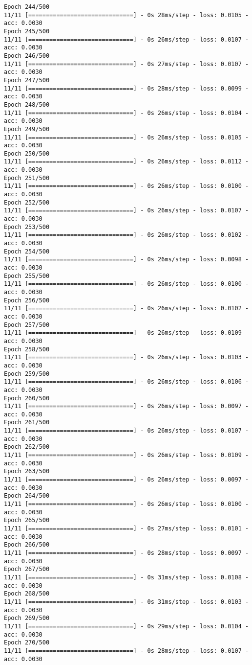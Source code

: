 \documentclass[11pt]{article}
\begin{document}
\begin{Verbatim}[commandchars=\\\{\}]
Epoch 244/500
11/11 [==============================] - 0s 28ms/step - loss: 0.0105 - acc: 0.0030
Epoch 245/500
11/11 [==============================] - 0s 26ms/step - loss: 0.0107 - acc: 0.0030
Epoch 246/500
11/11 [==============================] - 0s 27ms/step - loss: 0.0107 - acc: 0.0030
Epoch 247/500
11/11 [==============================] - 0s 28ms/step - loss: 0.0099 - acc: 0.0030
Epoch 248/500
11/11 [==============================] - 0s 26ms/step - loss: 0.0104 - acc: 0.0030
Epoch 249/500
11/11 [==============================] - 0s 26ms/step - loss: 0.0105 - acc: 0.0030
Epoch 250/500
11/11 [==============================] - 0s 26ms/step - loss: 0.0112 - acc: 0.0030
Epoch 251/500
11/11 [==============================] - 0s 26ms/step - loss: 0.0100 - acc: 0.0030
Epoch 252/500
11/11 [==============================] - 0s 26ms/step - loss: 0.0107 - acc: 0.0030
Epoch 253/500
11/11 [==============================] - 0s 26ms/step - loss: 0.0102 - acc: 0.0030
Epoch 254/500
11/11 [==============================] - 0s 26ms/step - loss: 0.0098 - acc: 0.0030
Epoch 255/500
11/11 [==============================] - 0s 26ms/step - loss: 0.0100 - acc: 0.0030
Epoch 256/500
11/11 [==============================] - 0s 26ms/step - loss: 0.0102 - acc: 0.0030
Epoch 257/500
11/11 [==============================] - 0s 26ms/step - loss: 0.0109 - acc: 0.0030
Epoch 258/500
11/11 [==============================] - 0s 26ms/step - loss: 0.0103 - acc: 0.0030
Epoch 259/500
11/11 [==============================] - 0s 26ms/step - loss: 0.0106 - acc: 0.0030
Epoch 260/500
11/11 [==============================] - 0s 26ms/step - loss: 0.0097 - acc: 0.0030
Epoch 261/500
11/11 [==============================] - 0s 26ms/step - loss: 0.0107 - acc: 0.0030
Epoch 262/500
11/11 [==============================] - 0s 26ms/step - loss: 0.0109 - acc: 0.0030
Epoch 263/500
11/11 [==============================] - 0s 26ms/step - loss: 0.0097 - acc: 0.0030
Epoch 264/500
11/11 [==============================] - 0s 26ms/step - loss: 0.0100 - acc: 0.0030
Epoch 265/500
11/11 [==============================] - 0s 27ms/step - loss: 0.0101 - acc: 0.0030
Epoch 266/500
11/11 [==============================] - 0s 28ms/step - loss: 0.0097 - acc: 0.0030
Epoch 267/500
11/11 [==============================] - 0s 31ms/step - loss: 0.0108 - acc: 0.0030
Epoch 268/500
11/11 [==============================] - 0s 31ms/step - loss: 0.0103 - acc: 0.0030
Epoch 269/500
11/11 [==============================] - 0s 29ms/step - loss: 0.0104 - acc: 0.0030
Epoch 270/500
11/11 [==============================] - 0s 28ms/step - loss: 0.0107 - acc: 0.0030

\end{Verbatim}
\end{document}
